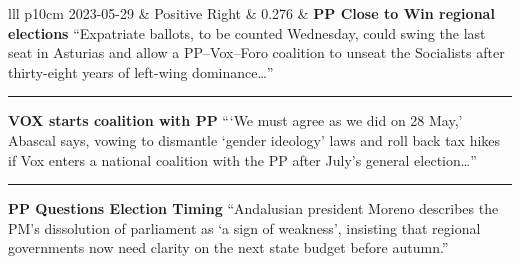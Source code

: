 \documentclass[12pt]{article}
\begin{document}
\begin{center}
\begin{longtable}{lll p{10cm}}
			2023-05-29 & Positive Right & 0.276 &
			\textbf{PP Close to Win regional elections}\newline
			{\scriptsize“Expatriate ballots, to be counted Wednesday, could swing the last seat in Asturias and allow a PP–Vox–Foro coalition to unseat the Socialists after thirty-eight years of left-wing dominance…”}\par\noindent\rule{\linewidth}{0.4pt}\par
			\textbf{VOX starts coalition with PP}\newline
			{\scriptsize“‘We must agree as we did on 28 May,’ Abascal says, vowing to dismantle ‘gender ideology’ laws and roll back tax hikes if Vox enters a national coalition with the PP after July’s general election…”}\par\noindent\rule{\linewidth}{0.4pt}\par
			\textbf{PP Questions Election Timing}\newline
			{\scriptsize“Andalusian president Moreno describes the PM’s dissolution of parliament as ‘a sign of weakness’, insisting that regional governments now need clarity on the next state budget before autumn.”} \\
			\hline
				\caption*{\textit{Notes:} The table shows days with highest increase in news production between midday and night editions for each content type together with the stories of that type that appeared on Agencia EFE between the two editions.}
			\label{tab:within}
		\end{longtable}
	\end{center}
	
	
	
\end{document}
